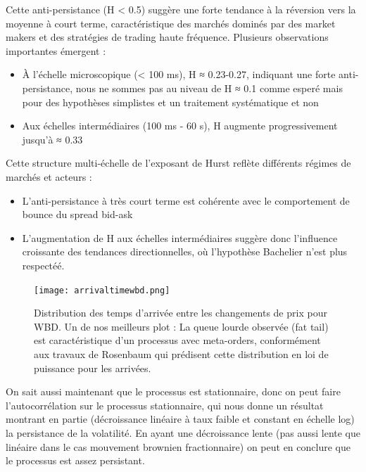 \documentclass[10pt,a4paper]{article}
\theoremstyle{definition}
\theoremstyle{remark}
\begin{document}
Cette anti-persistance (H < 0.5) suggère une forte tendance à la réversion vers la moyenne à court terme, caractéristique des marchés dominés par des market makers et des stratégies de trading haute fréquence. Plusieurs observations importantes émergent :

\begin{itemize}
    \item À l'échelle microscopique (< 100 ms), H ≈ 0.23-0.27, indiquant une forte anti-persistance, nous ne sommes pas au niveau de H ≈ 0.1 comme esperé mais pour des hypothèses simplistes et un traitement systématique et non 
    \item Aux échelles intermédiaires (100 ms - 60 s), H augmente progressivement jusqu'à ≈ 0.33
\end{itemize}

Cette structure multi-échelle de l'exposant de Hurst reflète différents régimes de marchés et acteurs :
\begin{itemize}
    \item L'anti-persistance à très court terme est cohérente avec le comportement de bounce du spread bid-ask
    \item L'augmentation de H aux échelles intermédiaires suggère donc l'influence croissante des tendances directionnelles, où l'hypothèse Bachelier n'est plus respectéé.
\end{itemize}

\begin{figure}[h!]
    \centering
        \texttt{[image: arrivaltimewbd.png]}
    \caption{Distribution des temps d'arrivée entre les changements de prix pour WBD. Un de nos meilleurs plot : La queue lourde observée (fat tail) est caractéristique d'un processus avec meta-orders, conformément aux travaux de Rosenbaum qui prédisent cette distribution en loi de puissance pour les arrivées.}
    \label{fig:arrival_times_wbd}
\end{figure}


On sait aussi maintenant que le processus est stationnaire, donc on peut faire l'autocorrélation sur le processus stationnaire, qui nous donne un résultat montrant en partie
(décroissance linéaire à taux faible et constant en échelle log) la persistance de la volatilité. En ayant une décroissance lente (pas aussi lente que linéaire dans le cas mouvement brownien fractionnaire)
on peut en conclure que le processus est assez persistant.
\end{document}
